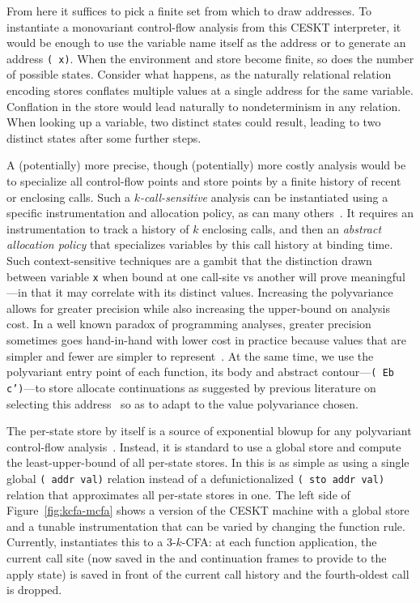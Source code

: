 From here it suffices to pick a finite set from which to draw addresses. To instantiate a monovariant control-flow analysis from this CESKT interpreter, it would be enough to use the variable name itself as the address or to generate an address \texttt{( x)}. When the environment and store become finite, so does the number of possible states. Consider what happens, as the naturally relational  relation encoding stores conflates multiple values at a single address for the same variable. Conflation in the store would lead naturally to nondeterminism in any  relation. When looking up a variable, two distinct  states could result, leading to two distinct  states after some further steps.

A (potentially) more precise, though (potentially) more costly analysis would be to specialize all control-flow points and store points by a finite history of recent or enclosing calls. Such a \emph{$k$-call-sensitive} analysis can be instantiated using a specific instrumentation and allocation policy, as can many others~\cite{gilray2016poly}. It requires an instrumentation to track a history of $k$ enclosing calls, and then an \emph{abstract allocation policy} that specializes variables by this call history at binding time. Such context-sensitive techniques are a gambit that the distinction drawn between variable \texttt{x} when bound at one call-site vs another will prove meaningful---in that it may correlate with its distinct values. Increasing the polyvariance allows for greater precision while also increasing the upper-bound on analysis cost. In a well known paradox of programming analyses, greater precision sometimes goes hand-in-hand with lower cost in practice because values that are simpler and fewer are simpler to represent~\cite{wright1998polymorphic}. At the same time, we use the polyvariant entry point of each function, its body and abstract contour---\texttt{( Eb c')}---to store allocate continuations as suggested by previous literature on selecting this address~\cite{gilray2016p4f} so as to adapt to the value polyvariance chosen.

The per-state store by itself is a source of exponential blowup for any polyvariant control-flow analysis~\cite{midtgaard2012control}. Instead, it is standard to use a global store and compute the least-upper-bound of all per-state stores. In \slog{} this is as simple as using a single global \texttt{( addr val)} relation instead of a defunictionalized \texttt{( sto addr val)} relation that approximates all per-state stores in one. The left side of Figure~\ref{fig:kcfa-mcfa} shows a version of the CESKT machine with a global store and a tunable instrumentation that can be varied by changing the  function rule. Currently,  instantiates this to a $3$-$k$-CFA: at each function application, the current call site (now saved in the  and  continuation frames to provide to the apply state) is saved in front of the current call history and the fourth-oldest call is dropped.


